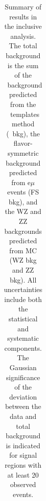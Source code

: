\begin{table}[htb]
\begin{center}
\footnotesize
\caption{\label{tab:results_incl} Summary of results in the inclusive analysis. The total background is the sum of the \zjets\ background predicted from
the \MET\ templates method (\zjets\ bkg), the flavor-symmetric background predicted from e$\mu$ events (FS bkg), and the WZ and ZZ backgrounds predicted from MC
(WZ bkg and ZZ bkg). All uncertainties include both the statistical and systematic components. The Gaussian significance of the deviation between the data 
and total background is indicated for signal regions with at least 20 observed events. }
\begin{tabular}{l|c|c|c|c|c|c}

\hline
\hline




\end{tabular}
\end{center}
\end{table}
